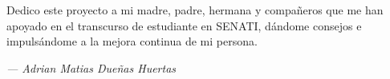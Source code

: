Dedico este proyecto a mi madre, padre, hermana y compañeros que me han apoyado en el transcurso de estudiante en SENATI, dándome consejos e impulsándome a la mejora continua de mi persona.
\begin{flushright}
    \small\textit{--- Adrian Matias Dueñas Huertas}
\end{flushright}